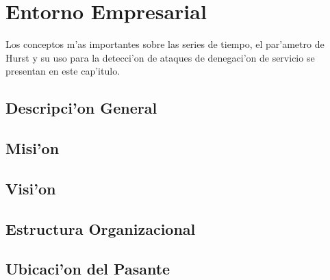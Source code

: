 \chapter{Entorno Empresarial} \label{chap:empresa}


Los conceptos m'as importantes sobre las series de tiempo, el par'ametro de 
Hurst y su uso para la detecci'on de ataques de denegaci'on de servicio se 
presentan en este cap'itulo.


\section{Descripci'on General} \label{sect:descripcion}

\section{Misi'on} \label{sect:mision}

\section{Visi'on} \label{sect:vision}

\section{Estructura Organizacional} \label{sect:organizacion}

\section{Ubicaci'on del Pasante}